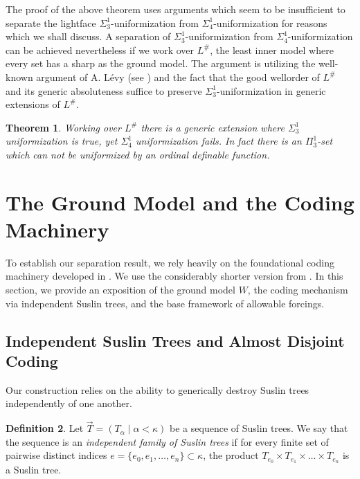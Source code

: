 \documentclass{article}
\theoremstyle{plain}
\newtheorem{theorem}{Theorem}[section]
\theoremstyle{definition}
\newtheorem{definition}[theorem]{Definition}
\begin{document}
The proof of the above theorem uses arguments which seem to be insufficient to separate the lightface $\Sigma^1_3$-uniformization from $\Sigma^1_4$-uniformization for reasons which we shall discuss. A separation of $\Sigma^1_3$-uniformization from $\Sigma^1_4$-uniformization can be achieved nevertheless if we work over $L^{\#}$, the least inner model where every set has a sharp as the ground model. The argument is utilizing the well-known argument of A. L\'evy (see \cite{levy1965definability}) and the fact that the good wellorder of $L^{\#}$ and its generic absoluteness suffice to preserve $\Sigma^1_3$-uniformization in generic extensions of $L^{\#}$.

\begin{theorem}
    Working over $L^{\#}$ there is a generic extension where $\Sigma^1_3$ uniformization is true, yet $\Sigma^1_4$ uniformization fails. In fact there is an $\Pi^1_3$-set which can not be uniformized by an ordinal definable function.
\end{theorem}

\section{The Ground Model and the Coding Machinery}
To establish our separation result, we rely heavily on the foundational coding machinery developed in \cite{hoffelner2023forcing}. We use the considerably shorter version from \cite{hoffelner2026failurepi1n3reductionpresencesigma1n3separation}. In this section, we provide an exposition of the ground model $W$, the coding mechanism via independent Suslin trees, and the base framework of allowable forcings. 

\subsection{Independent Suslin Trees and Almost Disjoint Coding}
Our construction relies on the ability to generically destroy Suslin trees independently of one another.

\begin{definition}
Let $\vec{T} = (T_\alpha \mid \alpha < \kappa)$ be a sequence of Suslin trees. We say that the sequence is an \emph{independent family of Suslin trees} if for every finite set of pairwise distinct indices $e = \{e_0, e_1, \dots, e_n\} \subset \kappa$, the product $T_{e_0} \times T_{e_1} \times \dots \times T_{e_n}$ is a Suslin tree.
\end{definition}
\end{document}
